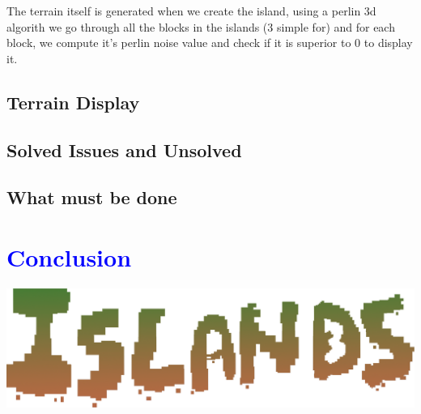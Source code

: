 \documentclass[article]{report} %
\begin{document}
				The terrain itself is generated when we create the island, using a perlin 3d algorith we go through all the blocks in the islands (3 simple for) and for each block, we compute it's perlin noise value and check if it is superior to 0 to display it.
				
			\section{Terrain Display}

			\section{Solved Issues and Unsolved}			

			\section{What must be done}
	\chapter{\textcolor{blue}{Conclusion}}

					 

					


				\begin{center}
					\includegraphics[width = 16cm]{Images/Islands_Title.png}
				\end{center}     	     		
\end{document}
